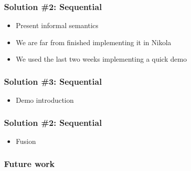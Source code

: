 \documentclass{beamer}
\begin{document}
\begin{frame}
  \frametitle{Solution \#2: Sequential}
  \begin{itemize}
  \item Present informal semantics
  \item We are far from finished implementing it in Nikola
  \item We used the last two weeks implementing a quick demo
  \end{itemize}
\end{frame}

\begin{frame}
  \frametitle{Solution \#3: Sequential}
  \begin{itemize}
  \item Demo introduction
  \end{itemize}
\end{frame}

\begin{frame}
  \frametitle{Solution \#2: Sequential}
  \begin{itemize}
  \item Fusion
  \end{itemize}
\end{frame}

\begin{frame}
  \frametitle{Future work}
\end{frame}
\end{document}
